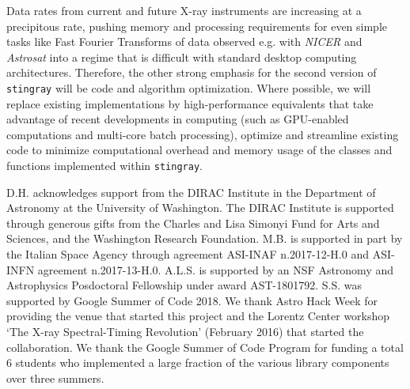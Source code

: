 \documentclass[twocolumn]{aastex62}
\newcommand{\stingray}{\texttt{stingray}\xspace}
\begin{document}
Data rates from current and future X-ray instruments are increasing at a precipitous rate, pushing memory and processing requirements for even simple tasks like Fast Fourier Transforms of data observed e.g. with \textit{NICER} and \textit{Astrosat} into a regime that is difficult with standard desktop computing architectures. 
Therefore, the other strong emphasis for the second version of \stingray will be code and algorithm optimization. 
Where possible, we will replace existing implementations by high-performance equivalents that take advantage of recent developments in computing (such as GPU-enabled computations and multi-core batch processing), optimize and streamline existing code to minimize computational overhead and memory usage of the classes and functions implemented within \stingray. 


\acknowledgments

D.H. acknowledges support from the DIRAC Institute in the Department of Astronomy at the University of Washington. 
The DIRAC Institute is supported through generous gifts from the Charles and Lisa Simonyi Fund for Arts and Sciences, and the Washington Research Foundation.
M.B. is supported in part by the Italian Space Agency through agreement ASI-INAF n.2017-12-H.0 and ASI-INFN agreement n.2017-13-H.0.
A.L.S. is supported by an NSF Astronomy and Astrophysics Posdoctoral Fellowship under award AST-1801792.
S.S. was supported by Google Summer of Code 2018.
We thank Astro Hack Week for providing the venue that started this project and the Lorentz Center workshop `The X-ray Spectral-Timing Revolution' (February 2016) that started the collaboration. 
We thank the Google Summer of Code Program for funding a total 6 students who implemented a large fraction of the various library components over three summers.


\end{document}

